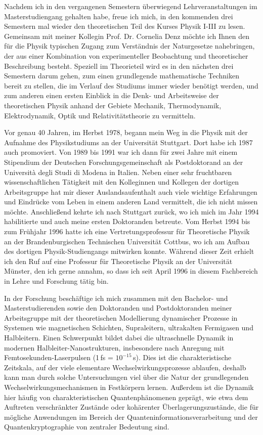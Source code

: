 \begin{multicols}{2}
Nachdem ich in den vergangenen Semestern überwiegend Lehrveranstaltungen im Masterstudiengang gehalten habe, freue ich mich, in den kommenden drei Semestern mal wieder den theoretischen Teil des Kurses Physik I-III zu lesen. Gemeinsam mit meiner Kollegin Prof. Dr. Cornelia Denz möchte ich Ihnen den für die Physik typischen Zugang zum Verständnis der Naturgesetze nahebringen, der aus einer Kombination von experimenteller Beobachtung und theoretischer Beschreibung besteht. Speziell im Theorieteil wird es in den nächsten drei Semestern darum gehen, zum einen grundlegende mathematische Techniken bereit zu stellen, die im Verlauf des Studiums immer wieder benötigt werden, und zum anderen einen ersten Einblick in die Denk- und Arbeitsweise der theoretischen Physik anhand der Gebiete Mechanik, Thermodynamik, Elektrodynamik, Optik und Relativitätstheorie zu vermitteln.

Vor genau 40 Jahren, im Herbst 1978, begann mein Weg in die Physik mit der Aufnahme des Physikstudiums an der Universität Stuttgart. Dort habe ich 1987 auch promoviert. Von 1989 bis 1991 war ich dann für zwei Jahre mit einem Stipendium der Deutschen Forschungsgemeinschaft als Postdoktorand an der Università degli Studi di Modena in Italien. Neben einer sehr fruchtbaren wissenschaftlichen Tätigkeit mit den Kolleginnen und Kollegen der dortigen Arbeitsgruppe hat mir dieser Auslandsaufenthalt auch viele wichtige Erfahrungen und Eindrücke vom Leben in einem anderen Land vermittelt, die ich nicht missen möchte. Anschließend kehrte ich nach Stuttgart zurück, wo ich mich im Jahr 1994 habilitierte und auch meine ersten Doktoranden betreute. Vom Herbst 1994 bis zum Frühjahr 1996 hatte ich eine Vertretungsprofessur für Theoretische Physik an der Brandenburgischen Technischen Universität Cottbus, wo ich am Aufbau des dortigen Physik-Studiengangs mitwirken konnte. Während dieser Zeit erhielt ich den Ruf auf eine Professur für Theoretische Physik an der Universität Münster, den ich gerne annahm, so dass ich seit April 1996 in diesem Fachbereich in Lehre und Forschung tätig bin.

In der Forschung beschäftige ich mich zusammen mit den Bachelor- und Masterstudierenden sowie den Doktoranden und Postdoktoranden meiner Arbeitsgruppe mit der theoretischen Modellierung dynamischer Prozesse in Systemen wie magnetischen Schichten, Supraleitern, ultrakalten Fermigasen und Halbleitern. Einen Schwerpunkt bildet dabei die ultraschnelle Dynamik in modernen Halbleiter-Nanostrukturen, insbesondere nach Anregung mit Femtosekunden-Laserpulsen (1\,fs = $10^{-15}$\,s). Dies ist die charakteristische Zeitskala, auf der viele elementare Wechselwirkungsprozesse ablaufen, deshalb kann man durch solche Untersuchungen viel über die Natur der grundlegenden Wechselwirkungsmechanismen in Festkörpern lernen. Außerdem ist die Dynamik hier häufig von charakteristischen Quantenphänomenen geprägt, wie etwa dem Auftreten verschränkter Zustände oder kohärenter Überlagerungszustände, die für mögliche Anwendungen im Bereich der Quanteninformationsverarbeitung und der Quantenkryptographie von zentraler Bedeutung sind.

\end{multicols}
